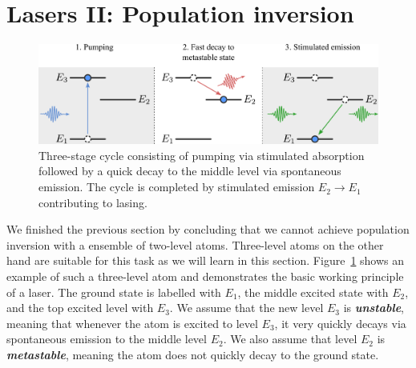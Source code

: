 \section{Lasers II: Population inversion}
\label{sec:5-4_lasers2}

\begin{figure}[t]
    \centering
    \includegraphics[width=\textwidth]{lesson5/5-4_three-level-atom.pdf}
    \caption[Laser cycle]{Three-stage cycle consisting of pumping via stimulated absorption followed by a quick decay to the middle level via spontaneous emission. The cycle is completed by stimulated emission $E_2 \rightarrow E_1$ contributing to lasing.}
    \label{fig:5-4_three_level_atom}
\end{figure}

We finished the previous section by concluding that we cannot achieve population inversion with a ensemble of two-level atoms.
Three-level atoms on the other hand are suitable for this task as we will learn in this section.
Figure~\ref{fig:5-4_three_level_atom} shows an example of such a three-level atom and demonstrates the basic working principle of a laser.
The ground state is labelled with $E_1$, the middle excited state with $E_2$, and the top excited level with $E_3$.
We assume that the new level $E_3$ is \textbf{\emph{unstable}}, meaning that whenever the atom is excited to level $E_3$, it very quickly decays via spontaneous emission to the middle level $E_2$.
We also assume that level $E_2$ is \textbf{\emph{metastable}}, meaning the atom does not quickly decay to the ground state.

